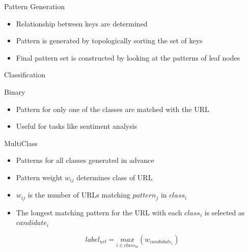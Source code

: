 \documentclass[presentation]{beamer}
\begin{document}
\begin{frame}[label={sec:orgheadline18}]{Pattern Generation}
\begin{itemize}
\item Relationship between keys are determined
\item Pattern is generated by topologically sorting the set of keys
\item Final pattern set is constructed by looking at the patterns of leaf nodes
\end{itemize}
\end{frame}

\begin{frame}[label={sec:orgheadline19}]{Classification}
\begin{block}{Binary}
\begin{itemize}
\item Pattern for only one of the classes are matched with the URL
\item Useful for tasks like sentiment analysis
\end{itemize}
\end{block}

\begin{block}{MultiClass}
\begin{itemize}
\item Patterns for all classes generated in advance
\item Pattern weight \(w_{ij}\) determines class of URL
\item \(w_{ij}\) is the number of URLs matching \(pattern_j\) in \(class_i\)
\item The longest matching pattern for the URL with each \(class_i\) is selected as \(candidate_i\)
\end{itemize}
\begin{equation}
label_{url} = \underset{i \in class_m}{max}(w_{candidate_i})
\end{equation}
\end{block}
\end{frame}
\end{document}
